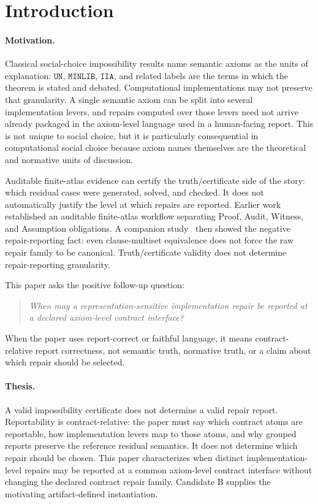 \section{Introduction}
\label{sec:introduction}

\paragraph{Motivation.}
Classical social-choice impossibility results name semantic axioms as the
units of explanation: \(\mathtt{UN}\), \(\mathtt{MINLIB}\), \(\mathtt{IIA}\),
and related labels are the terms in which the theorem is stated and debated.
Computational implementations may not preserve that granularity.  A single
semantic axiom can be split into several implementation levers, and repairs
computed over those levers need not arrive already packaged in the axiom-level
language used in a human-facing report.  This is not unique to social choice,
but it is particularly consequential in computational social choice because
axiom names themselves are the theoretical and normative units of discussion.

Auditable finite-atlas evidence can certify the truth/certificate side of the
story: which residual cases were generated, solved, and checked.  It does not
automatically justify the level at which repairs are reported.  Earlier
work~\citep{hayashida2026atlas} established an auditable finite-atlas workflow
separating Proof, Audit, Witness, and Assumption obligations.  A companion
study~\citep{hayashida2026repair} then showed the negative repair-reporting
fact:
even clause-multiset equivalence does not force the raw repair family to be
canonical.  Truth/certificate validity does not determine repair-reporting
granularity.

This paper asks the positive follow-up question:
\begin{quote}
\emph{When may a representation-sensitive implementation repair be reported at
a declared axiom-level contract interface?}
\end{quote}
When the paper uses report-correct or faithful language, it means
contract-relative report correctness, not semantic truth, normative truth, or a
claim about which repair should be selected.

\paragraph{Thesis.}
A valid impossibility certificate does not determine a valid repair report.
Reportability is contract-relative: the paper must say which contract atoms
are reportable, how implementation levers map to those atoms, and why grouped
reports preserve the reference residual semantics.  It does not determine
which repair should be chosen.  This paper characterizes when distinct
implementation-level repairs may be reported at a common axiom-level contract
interface without changing the declared contract repair family.
Candidate B supplies the motivating artifact-defined instantiation.


